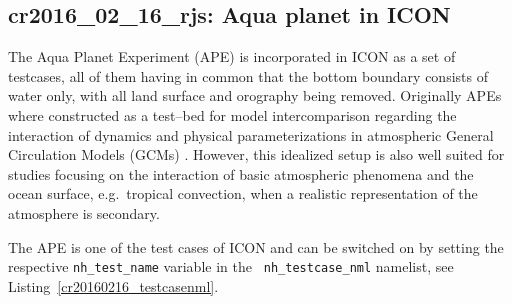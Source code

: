 \subsection[cr2016\_02\_16\_rjs: Aqua planet in ICON]{cr2016\_02\_16\_rjs:
  Aqua planet in ICON}\label{cr20140715rjs}

The Aqua Planet Experiment (APE) is incorporated in ICON as a set of 
testcases, all of them having in common that the bottom boundary
consists of water only, with all land surface and orography being
removed. Originally APEs where constructed as a test--bed for model
intercomparison regarding the interaction of dynamics and physical
parameterizations in atmospheric General Circulation Models (GCMs)
\cite{nea019,nea010}. However, this idealized setup is also well
suited for studies focusing on the interaction of basic atmospheric
phenomena and the ocean surface, e.g.~tropical convection, when a
realistic representation of the atmosphere is secondary. 

The APE is one of the test cases of ICON and can be switched on
by setting the respective {\tt nh\_test\_name} variable in the {\tt
  nh\_testcase\_nml} namelist, see Listing~\ref{cr20160216_testcasenml}.

